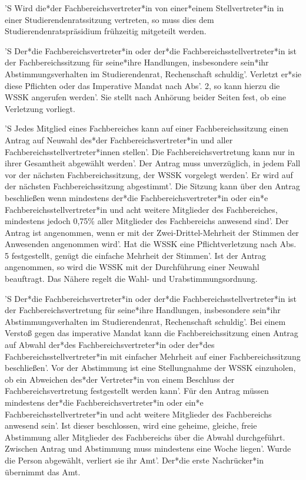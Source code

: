\documentclass[fontsize=12pt,parskip=half]{scrartcl}
\begin{document}
\begin{contract}
  'S Wird die*der Fachbereichsvertreter*in von einer*einem Stellvertreter*in in
  einer Studierendenratssitzung vertreten, so muss dies dem
  Studierendenratspräsidium frühzeitig mitgeteilt werden.

  'S Der*die Fachbereichsvertreter*in oder der*die Fachbereichsstellvertreter*in
  ist der Fachbereichssitzung für seine*ihre Handlungen, insbesondere sein*ihr
  Abstimmungsverhalten im Studierendenrat, Rechenschaft schuldig'. Verletzt
  er*sie diese Pflichten oder das Imperative Mandat nach Abs'. 2, so kann hierzu
  die WSSK angerufen werden'. Sie stellt nach Anhörung beider Seiten fest, ob
  eine Verletzung vorliegt.

  'S Jedes Mitglied eines Fachbereiches kann auf einer Fachbereichssitzung einen
  Antrag auf Neuwahl des*der Fachbereichsvertreter*in und aller
  Fachbereichsstellvertreter*innen stellen'. Die Fachbereichsvertretung kann nur
  in ihrer Gesamtheit abgewählt werden'. Der Antrag muss unverzüglich, in jedem
  Fall vor der nächsten Fachbereichssitzung, der WSSK vorgelegt werden'. Er wird
  auf der nächsten Fachbereichssitzung abgestimmt'. Die Sitzung kann über den
  Antrag beschließen wenn mindestens der*die Fachbereichsvertreter*in oder ein*e
  Fachbereichsstellvertreter*in und acht weitere Mitglieder des Fachbereiches,
  mindestens jedoch 0,75\% aller Mitglieder des Fachbereichs anwesend sind'. Der
  Antrag ist angenommen, wenn er mit der Zwei-Drittel-Mehrheit der Stimmen der
  Anwesenden angenommen wird'. Hat die WSSK eine Pflichtverletzung nach Abs. 5
  festgestellt, genügt die einfache Mehrheit der Stimmen'. Ist der Antrag
  angenommen, so wird die WSSK mit der Durchführung einer Neuwahl beauftragt.
  Das Nähere regelt die Wahl- und Urabstimmungsordnung.

  'S Der*die Fachbereichsvertreter*in oder der*die Fachbereichsstellvertreter*in
  ist der Fachbereichsvertretung für seine*ihre Handlungen, insbesondere
  sein*ihr Abstimmungsverhalten im Studierendenrat, Rechenschaft schuldig'. Bei
  einem Verstoß gegen das imperative Mandat kann die Fachbereichssitzung einen
  Antrag auf Abwahl der*des Fachbereichsvertreter*in oder der*des
  Fachbereichsstellvertreter*in mit einfacher Mehrheit auf einer
  Fachbereichssitzung beschließen'. Vor der Abstimmung ist eine Stellungnahme der
  WSSK einzuholen, ob ein Abweichen des*der Vertreter*in von einem Beschluss der
  Fachbereichsvertretung festgestellt werden kann'. Für den Antrag müssen
  mindestens der*die Fachbereichsvertreter*in oder ein*e
  Fachbereichsstellvertreter*in und acht weitere Mitglieder des Fachbereichs
  anwesend sein'. Ist dieser beschlossen, wird eine geheime, gleiche, freie
  Abstimmung aller Mitglieder des Fachbereichs über die Abwahl durchgeführt.
  Zwischen Antrag und Abstimmung muss mindestens eine Woche liegen'. Wurde die
  Person abgewählt, verliert sie ihr Amt'. Der*die erste Nachrücker*in übernimmt
  das Amt.

\end{contract}
\end{document}
